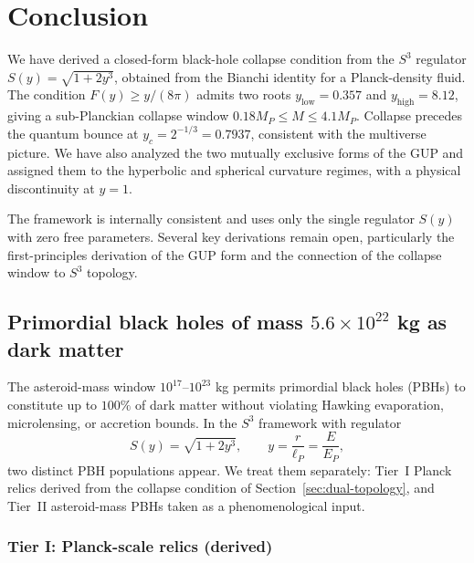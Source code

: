 \documentclass[12pt,oneside,openany]{book}
\begin{document}
\section{Conclusion}

We have derived a closed-form black-hole collapse condition
from the $S^{3}$ regulator $S(y)=\sqrt{1+2y^{3}}$, obtained
from the Bianchi identity for a Planck-density fluid. The
condition $F(y)\geq y/(8\pi)$ admits two roots
$y_{\text{low}}=0.357$ and $y_{\text{high}}=8.12$, giving a
sub-Planckian collapse window $0.18 M_{P}\leq M\leq 4.1 M_{P}$.
Collapse precedes the quantum bounce at
$y_{c}=2^{-1/3}=0.7937$, consistent with the multiverse picture.
We have also analyzed the two mutually exclusive forms of the
GUP and assigned them to the hyperbolic and spherical curvature
regimes, with a physical discontinuity at $y=1$.

The framework is internally consistent and uses only the single
regulator $S(y)$ with zero free parameters. Several key
derivations remain open, particularly the first-principles
derivation of the GUP form and the connection of the collapse
window to $S^{3}$ topology.

\subsection{Primordial black holes of mass $5.6\times10^{22}$ kg
as dark matter}
\label{sec:PBH-asteroid}

The asteroid-mass window $10^{17}$--$10^{23}$ kg permits
primordial black holes (PBHs) to constitute up to $100\%$ of
dark matter without violating Hawking evaporation, microlensing,
or accretion bounds. In the $S^{3}$ framework with regulator
\begin{equation}
S(y)=\sqrt{1+2y^{3}},\qquad y=\frac{r}{\ell_{P}}=\frac{E}{E_{P}},
\label{eq:S-PBH}
\end{equation}
two distinct PBH populations appear. We treat them separately:
Tier~I Planck relics derived from the collapse condition of
Section~\ref{sec:dual-topology}, and Tier~II asteroid-mass PBHs
taken as a phenomenological input.

\subsubsection{Tier I: Planck-scale relics (derived)}
\end{document}
